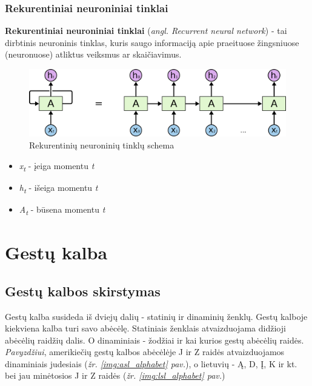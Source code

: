 \documentclass{VUMIFInfKursinis}
\begin{document}
\subsubsection{Rekurentiniai neuroniniai tinklai}
\textbf{Rekurentiniai neuroniniai tinklai} (\textit{angl. Recurrent neural network}) - tai dirbtinis neuroninis tinklas, kuris saugo informaciją apie praeituose žingsniuose (neuronuose) atliktus veiksmus ar skaičiavimus.

\begin{figure}[H]
	\centering
	\includegraphics[width=.8\linewidth]{img/rnn}
	\caption{Rekurentinių neuroninių tinklų schema \cite{RecurrentNeuralNetwork}}
	\label{img:rnn}
\end{figure}
\begin{itemize}
	\item \textit{x\textsubscript{t}} - įeiga momentu \textit{t}
	\item \textit{h\textsubscript{t}} - išeiga momentu \textit{t}	
	\item \textit{A\textsubscript{t}} - būsena momentu \textit{t}	
\end{itemize}




\section{Gestų kalba}
\subsection{Gestų kalbos skirstymas}
Gestų kalba susideda iš dviejų dalių - statinių ir dinaminių ženklų. Gestų kalboje kiekviena kalba turi savo abėcėlę. Statiniais ženklais atvaizduojama didžioji abėcėlių raidžių dalis. O dinaminiais - žodžiai ir kai kurios gestų abėcėlių raidės. \textit{Pavyzdžiui}, amerikiečių gestų kalbos abėcėlėje J ir Z raidės atvaizduojamos dinaminiais judesiais (\textit{žr. \ref{img:asl_alphabet} pav.}), o lietuvių - Ą, D, Į, K ir kt. bei jau minėtosios J ir Z raidės (\textit{žr. \ref{img:lsl_alphabet} pav.})
\end{document}
